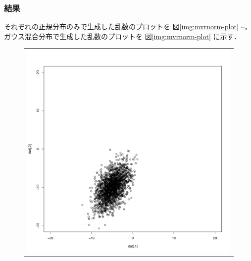 \documentclass{jsarticle}
\begin{document}
\subsubsection*{結果}
それぞれの正規分布のみで生成した乱数のプロットを
図\ref{img:mvrnorm-plot}
--，
ガウス混合分布で生成した乱数のプロットを
図\ref{img:mvrnorm-plot}
に示す．

\begin{figure}[b]
	\centering
	\begin{minipage}{0.8\hsize}
		\centering
		\begin{tabular}{c}
			\begin{minipage}{0.25\hsize}
				\centering
				\includegraphics[width=\linewidth]{img/mvrnorm-plot1.pdf}
				\subcaption{第1項の正規分布}
				\label{img:mvrnorm-plot1}
			\end{minipage}
			\begin{minipage}{0.25\hsize}
				\centering

\end{minipage}
\end{tabular}
\end{minipage}
\end{figure}
\end{document}
